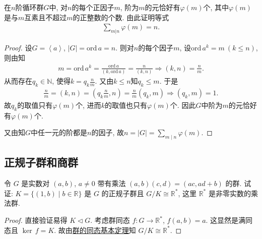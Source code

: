 \documentclass[../../main.tex]{subfiles}%
\begin{document}
\begin{example}
在$n$阶循环群$G$中, 对$n$的每个正因子$m$, 阶为$m$的元恰好有$\varphi(m)$个, 其中$\varphi(m)$是与$m$互素且不超过$m$的正整数的个数. 由此证明等式
\begin{align*}
\sum\limits_{m|n}\varphi(m)=n.
\end{align*}
\end{example}
\begin{proof}

设$G=\left< a \right>$, $|G|=\mathrm{ord}\,a=n$. 则对$n$的每个因子$m$, 设$\mathrm{ord}\,a^k=m\ (k\leqslant n)$, 则由知
\begin{align*}
m=\mathrm{ord}\,a^k=\frac{\mathrm{ord}\,a}{(k,\mathrm{ord}\,a)}=\frac{n}{(k,n)}\Longrightarrow (k,n)=\frac{n}{m}.
\end{align*}
从而存在$q_k\in\mathbb{N}$, 使得$k=q_k\frac{n}{m}$. 又由$k\leqslant n$知$q_k\leqslant m$. 于是
\begin{align*}
\frac{n}{m}=(k,n)=\left(q_k\frac{n}{m},n\right)=\frac{n}{m}(q_k,m)\Longrightarrow (q_k,m)=1.
\end{align*}
故$q_k$的取值只有$\varphi(m)$个, 进而$k$的取值也只有$\varphi(m)$个. 因此$G$中阶为$m$的元恰好有$\varphi(m)$个.

又由知$G$中任一元的阶都是$n$的因子, 故$n=|G|=\sum\limits_{m\mid n}\varphi(m).$

\end{proof}

\subsection{正规子群和商群}

\begin{example}
令 \(G\) 是实数对 \((a, b)\), \(a \neq 0\) 带有乘法 \((a, b)(c, d) = (ac, ad + b)\) 的群.
试证: \(K = \{(1, b) \mid b \in \mathbb{R}\}\) 是 \(G\) 的正规子群且 \(G/K \cong \mathbb{R}^*\), 这里 \(\mathbb{R}^*\) 是非零实数的乘法群.
\end{example}
\begin{proof}

直接验证易得 \(K \lhd G\). 考虑群同态 \(f: G \to \mathbb{R}^*\), \(f(a, b) = a\). 这显然是满同态且 \(\operatorname{ker}\,f = K\). 故由\hyperref[theorem:群的同态基本定理]{群的同态基本定理}知 \(G/K \cong \mathbb{R}^*\).

\end{proof}
\end{document}
